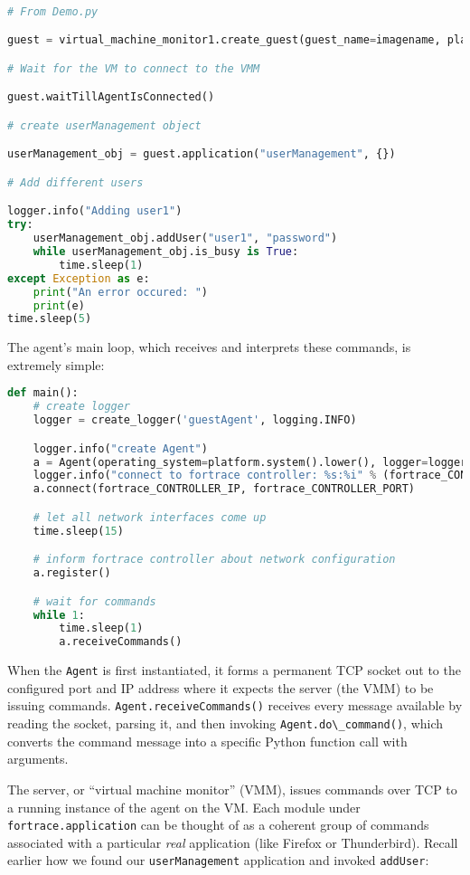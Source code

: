 \documentclass[letterpaper,12pt]{report}
\newcommand{\passthrough}[1]{#1}
\begin{document}
\begin{lstlisting}[language=Python]

# From Demo.py

guest = virtual_machine_monitor1.create_guest(guest_name=imagename, platform="windows")

# Wait for the VM to connect to the VMM

guest.waitTillAgentIsConnected()

# create userManagement object

userManagement_obj = guest.application("userManagement", {})

# Add different users

logger.info("Adding user1")
try:
    userManagement_obj.addUser("user1", "password")
    while userManagement_obj.is_busy is True:
        time.sleep(1)
except Exception as e:
    print("An error occured: ")
    print(e)
time.sleep(5)
\end{lstlisting}

The agent's main loop, which receives and interprets these commands, is
extremely simple:

\begin{lstlisting}[language=Python]
def main():
    # create logger
    logger = create_logger('guestAgent', logging.INFO)

    logger.info("create Agent")
    a = Agent(operating_system=platform.system().lower(), logger=logger)
    logger.info("connect to fortrace controller: %s:%i" % (fortrace_CONTROLLER_IP, fortrace_CONTROLLER_PORT))
    a.connect(fortrace_CONTROLLER_IP, fortrace_CONTROLLER_PORT)

    # let all network interfaces come up
    time.sleep(15)

    # inform fortrace controller about network configuration
    a.register()

    # wait for commands
    while 1:
        time.sleep(1)
        a.receiveCommands()
\end{lstlisting}

When the \passthrough{\lstinline!Agent!} is first instantiated, it forms
a permanent TCP socket out to the configured port and IP address where
it expects the server (the VMM) to be issuing commands.
\passthrough{\lstinline!Agent.receiveCommands()!} receives every message
available by reading the socket, parsing it, and then invoking
\passthrough{\lstinline!Agent.do\_command()!}, which converts the
command message into a specific Python function call with arguments.

The server, or ``virtual machine monitor'' (VMM), issues commands over
TCP to a running instance of the agent on the VM. Each module under
\passthrough{\lstinline!fortrace.application!} can be thought of as a
coherent group of commands associated with a particular \emph{real}
application (like Firefox or Thunderbird). Recall earlier how we found
our \passthrough{\lstinline!userManagement!} application and invoked
\passthrough{\lstinline!addUser!}:
\end{document}
